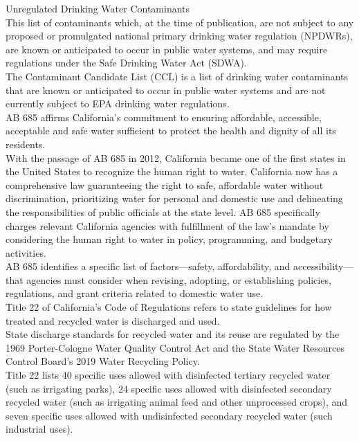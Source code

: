 Unregulated Drinking Water Contaminants\\
This list of contaminants which, at the time of publication, are not subject to any proposed or promulgated national primary drinking water regulation (NPDWRs), are known or anticipated to occur in public water systems, and may require regulations under the Safe Drinking Water Act (SDWA).\\

The Contaminant Candidate List (CCL) is a list of drinking water contaminants that are known or anticipated to occur in public water systems and are not currently subject to EPA drinking water regulations.\\



AB 685 affirms California’s commitment to ensuring affordable, accessible, acceptable and safe water sufficient to protect the health and
dignity of all its residents.\\

With the passage of AB 685 in 2012, California became one of the first states in the United States
to recognize the human right to water. California now has a comprehensive law guaranteeing the right
to safe, affordable water without discrimination, prioritizing water for personal and domestic use and
delineating the responsibilities of public officials at the state level. AB 685 specifically charges relevant
California agencies with fulfillment of the law’s mandate by considering the human right to water in
policy, programming, and budgetary activities.\\

AB 685 identifies a specific list
of factors—safety, affordability, and accessibility—that agencies must consider when revising,
adopting, or establishing policies, regulations, and
grant criteria related to domestic water use.\\




Title 22 of California’s Code of Regulations refers to state guidelines for how treated and recycled water is discharged and used.\\

State discharge standards for recycled water and its reuse are regulated by the 1969 Porter-Cologne Water Quality Control Act and the State Water Resources Control Board’s 2019 Water Recycling Policy.\\

Title 22 lists 40 specific uses allowed with disinfected tertiary recycled water (such as irrigating parks), 24 specific uses allowed with disinfected secondary recycled water (such as irrigating animal feed and other unprocessed crops), and seven specific uses allowed with undisinfected secondary recycled water (such industrial uses).\\

